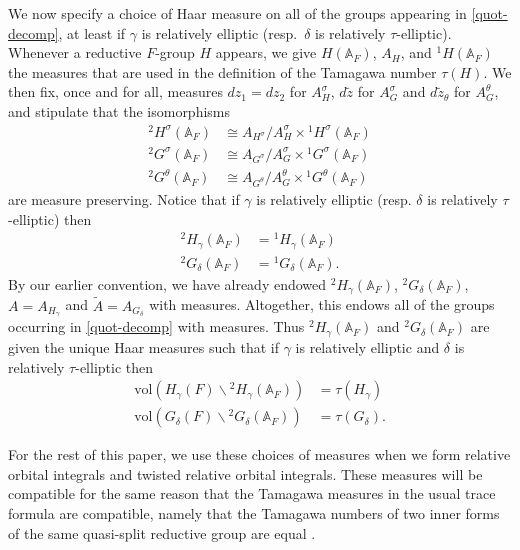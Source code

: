 \documentclass[12pt]{amsart}
\theoremstyle{remark}
\numberwithin{equation}{section}
\newcommand{\A}{\mathbb{A}}
\theoremstyle{definition}
\numberwithin{equation}{subsection}
\begin{document}
We now specify a choice of Haar measure on all of the groups appearing in \eqref{quot-decomp}, at least if $\gamma$ is relatively elliptic (resp.~$\delta$ is relatively $\tau$-elliptic).
Whenever a reductive $F$-group $H$ appears, we give $H(\A_F)$, $A_H$, and ${}^1H(\A_F)$ the measures that are
used in the definition of the Tamagawa number $\tau(H)$.  We then fix, once and for all, measures
 $dz_1=dz_2$ for $A_{H}^{\sigma}$, $d\widetilde{z}$ for $A_{G}^{\sigma}$ and $d\widetilde{z}_{\theta}$ for $A_{G}^{\theta}$, and stipulate that the isomorphisms
{\allowdisplaybreaks \begin{align*}
{}^2H^{\sigma}(\A_F) &\cong A_{H^{\sigma}}/A_H^{\sigma} \times {}^1H^{\sigma}(\A_F)\\
{}^2G^{\sigma}(\A_F) &\cong A_{G^{\sigma}}/A_{G}^{\sigma} \times {}^1G^{\sigma}(\A_F)\\
{}^2G^{\theta}(\A_F) &\cong A_{G^{\theta}}/A_{G}^{\theta} \times {}^1G^{\theta}(\A_F)
\end{align*}}are measure preserving.
Notice that if $\gamma$ is relatively elliptic (resp. $\delta$ is relatively $\tau$-elliptic) then
\begin{align*}
{}^2H_{\gamma}(\A_F)&={}^1H_{\gamma}(\A_F)\\
{}^2G_{\delta}(\A_F)&= {}^1G_{\delta}(\A_F).
\end{align*}
By our earlier convention, we have already endowed ${}^2H_{\gamma}(\A_F)$, ${}^2G_{\delta}(\A_F)$,
$A=A_{H_{\gamma}}$ and $\widetilde{A}=A_{G_{\delta}}$ with measures.   Altogether, this endows all of the groups occurring in \eqref{quot-decomp} with measures.  Thus
 ${}^2H_{\gamma}(\A_F)$   and ${}^2G_{\delta}(\A_F)$ are given the unique Haar measures such that if $\gamma$ is relatively elliptic and $\delta$ is relatively $\tau$-elliptic then
\begin{align*}
\mathrm{vol}(H_{\gamma}(F) \backslash {}^2H_{\gamma}(\A_F))&=\tau(H_{\gamma})\\
\mathrm{vol}(G_{\delta}(F) \backslash
{}^2G_{\delta}(\A_F))&=\tau(G_{\delta}).
\end{align*}

For the rest of this paper, we use these choices of measures when we form relative orbital integrals and twisted relative orbital integrals.
These measures will be compatible for the same reason that the Tamagawa measures in the usual trace formula are compatible, namely that
the Tamagawa numbers of two inner forms of the same quasi-split reductive group are equal \cite{KottTama} \cite{Cherno}.
\end{document}
